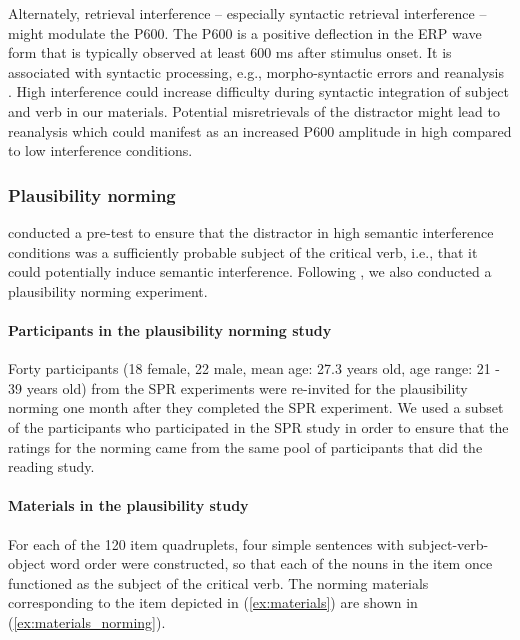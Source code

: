 \documentclass[review,preprint,12pt,authoryear,floatsintext]{elsarticle}
\begin{document}
{Alternately, retrieval interference -- especially syntactic retrieval interference -- might modulate the P600. The P600 is a positive deflection in the ERP wave form that is typically observed at least 600 ms after stimulus onset. It is associated with syntactic processing, e.g., morpho-syntactic errors and reanalysis \citep[see, e.g.,][]{osterhout&holcomb_1992, kaan_etal_2000_P600}. High interference could increase difficulty during syntactic integration of subject and verb in our materials. Potential misretrievals of the distractor might lead to reanalysis which could manifest as an increased P600 amplitude in high compared to low interference conditions.} \label{why_n400}




\subsubsection{Plausibility norming} \label{plausib_normin_orig}
\citeauthor{vandyke07} conducted a pre-test to ensure that the distractor in high semantic interference conditions was a sufficiently probable subject of the critical verb, i.e., that it could potentially induce semantic interference. Following \citeauthor{vandyke07}, we also conducted a plausibility norming experiment.

\paragraph{Participants in the plausibility norming study}
Forty participants (18 female, 22 male, mean age: 27.3 years old, age range: 21 - 39 years old) from the SPR experiments were re-invited for the plausibility norming one month after they completed the SPR experiment. We used a subset of the participants who participated in the SPR study in order to ensure that the ratings for the norming came from the same pool of participants that did the reading study.

\paragraph{Materials in the plausibility study}
For each of the 120 item quadruplets, four simple sentences with subject-verb-object word order were constructed, so that each of the nouns in the item once functioned as the subject of the critical verb. The norming materials corresponding to the item depicted in (\ref{ex:materials}) are shown in (\ref{ex:materials_norming}).
\end{document}
